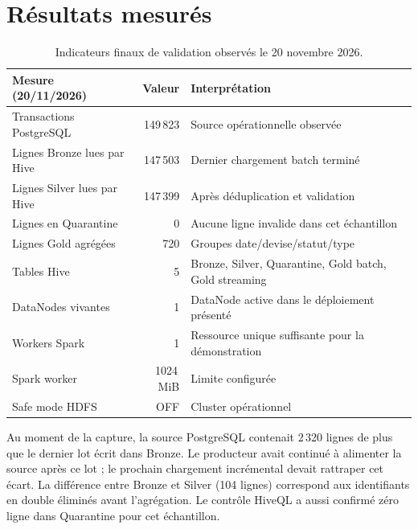 \documentclass[11pt,a4paper]{report}
\begin{document}
\section{Résultats mesurés}
\begin{table}[H]
\centering
\begin{tabularx}{\textwidth}{Y r Y}
\toprule
\textbf{Mesure (20/11/2026)} & \textbf{Valeur} & \textbf{Interprétation}\\
\midrule
Transactions PostgreSQL & 149\,823 & Source opérationnelle observée\\
Lignes Bronze lues par Hive & 147\,503 & Dernier chargement batch terminé\\
Lignes Silver lues par Hive & 147\,399 & Après déduplication et validation\\
Lignes en Quarantine & 0 & Aucune ligne invalide dans cet échantillon\\
Lignes Gold agrégées & 720 & Groupes date/devise/statut/type\\
Tables Hive & 5 & Bronze, Silver, Quarantine, Gold batch, Gold streaming\\
DataNodes vivantes & 1 & DataNode active dans le déploiement présenté\\
Workers Spark & 1 & Ressource unique suffisante pour la démonstration\\
Spark worker & 1024\,MiB & Limite configurée\\
Safe mode HDFS & OFF & Cluster opérationnel\\
\bottomrule
\end{tabularx}
\caption{Indicateurs finaux de validation observés le 20 novembre 2026.}
\end{table}

Au moment de la capture, la source PostgreSQL contenait 2\,320 lignes de plus
que le dernier lot écrit dans Bronze. Le producteur avait continué à alimenter
la source après ce lot ; le prochain chargement incrémental devait rattraper cet
écart. La différence entre Bronze et Silver (104 lignes) correspond aux
identifiants en double éliminés avant l'agrégation. Le contrôle HiveQL a aussi
confirmé zéro ligne dans Quarantine pour cet échantillon.
\end{document}

